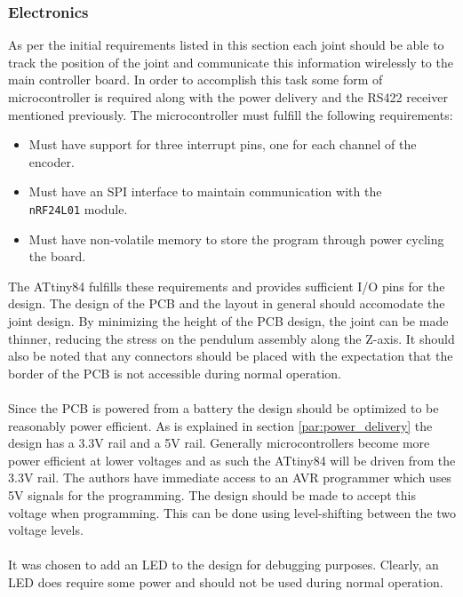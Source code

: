 \subsubsection{Electronics} %
\label{ssub:electronics}
As per the initial requirements listed in this section each joint should be able to track the position of the joint and communicate this information wirelessly to the main controller board.
In order to accomplish this task some form of microcontroller is required along with the power delivery and the RS422 receiver mentioned previously.
The microcontroller must fulfill the following requirements:
\begin{itemize}
 	\item Must have support for three interrupt pins, one for each channel of the encoder.
 	\item Must have an SPI interface to maintain communication with the\\ \texttt{nRF24L01} module.
 	\item Must have non-volatile memory to store the program through power cycling the board.
\end{itemize}
The ATtiny84 \cite{attiny84} fulfills these requirements and provides sufficient I/O pins for the design.
The design of the PCB and the layout in general should accomodate the joint design.
By minimizing the height of the PCB design, the joint can be made thinner, reducing the stress on the pendulum assembly along the Z-axis.
It should also be noted that any connectors should be placed with the expectation that the border of the PCB is not accessible during normal operation.
\\~\\
Since the PCB is powered from a battery the design should be optimized to be reasonably power efficient.
As is explained in section \ref{par:power_delivery} the design has a 3.3V rail and a 5V rail.
Generally microcontrollers become more power efficient at lower voltages and as such the ATtiny84 will be driven from the 3.3V rail.
The authors have immediate access to an AVR programmer which uses 5V signals for the programming.
The design should be made to accept this voltage when programming.
This can be done using level-shifting between the two voltage levels.
\\~\\
It was chosen to add an LED to the design for debugging purposes.
Clearly, an LED does require some power and should not be used during normal operation.
